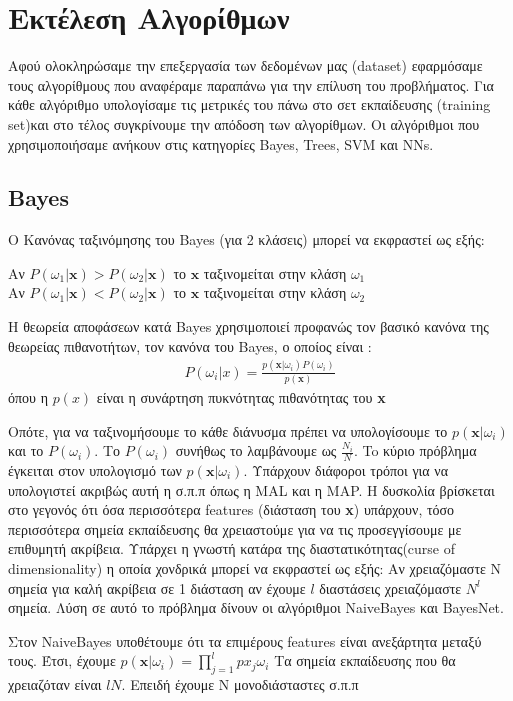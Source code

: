 \chapter{Εκτέλεση Αλγορίθμων}
Αφού ολοκληρώσαμε την επεξεργασία των δεδομένων μας (dataset) εφαρμόσαμε τους αλγορίθμους που αναφέραμε παραπάνω για την επίλυση του προβλήματος. Για κάθε αλγόριθμο υπολογίσαμε τις μετρικές του πάνω στο σετ εκπαίδευσης (training set)και στο τέλος συγκρίνουμε την απόδοση των αλγορίθμων. Οι αλγόριθμοι που χρησιμοποιήσαμε ανήκουν στις κατηγορίες Bayes, Trees, SVM και NNs.

\section{Bayes}
O Κανόνας ταξινόμησης του Βayes (για 2 κλάσεις) μπορεί να εκφραστεί ως εξής:
\begin{center}
Αν $P(\omega_1|\mathbf{x}) > P(\omega_2|\mathbf{x})$ το $\mathbf{x} $ ταξινομείται στην κλάση 
$\omega_1$\\
Αν $P(\omega_1|\mathbf{x}) < P(\omega_2|\mathbf{x})$ το $\mathbf{x} $ ταξινομείται στην κλάση 
$\omega_2$
\end{center}

Η θεωρεία αποφάσεων κατά Bayes χρησιμοποιεί προφανώς τον βασικό κανόνα της θεωρείας πιθανοτήτων, 
τον κανόνα του Bayes, ο οποίος είναι : 
\begin{align*}
P(\omega_i|x) = \frac{p(\mathbf{x}|\omega_i)P(\omega_i)}{p(\mathbf{x})}
\end{align*}
όπου η $p(x)$ είναι η συνάρτηση πυκνότητας πιθανότητας του  \textbf{x} 

Οπότε, για να ταξινομήσουμε το κάθε διάνυσμα πρέπει να υπολογίσουμε το $p(\mathbf{x}|\omega_i)$ και το
$P(\omega_i) $.
Το $ P(\omega_i)$ συνήθως το λαμβάνουμε ως $\frac{N_i}{N}$.
To κύριο πρόβλημα έγκειται
στον υπολογισμό των $p(\mathbf{x}|\omega_i)$.
Υπάρχουν διάφοροι τρόποι για να υπολογιστεί ακριβώς
αυτή  η σ.π.π όπως η MAL και η MAP.
Η δυσκολία βρίσκεται στο γεγονός ότι όσα περισσότερα features (διάσταση του  \textbf{x})
υπάρχουν, τόσο περισσότερα σημεία εκπαίδευσης θα χρειαστούμε για να τις 
προσεγγίσουμε με επιθυμητή ακρίβεια.
Υπάρχει η γνωστή κατάρα της διαστατικότητας(curse of dimensionality)
η οποία χονδρικά μπορεί να εκφραστεί ως εξής:
Αν χρειαζόμαστε Ν σημεία για καλή ακρίβεια σε 1 διάσταση αν έχουμε $l$ διαστάσεις χρειαζόμαστε $N^l$ σημεία.
Λύση σε αυτό το πρόβλημα δίνουν οι αλγόριθμοι NaiveBayes και BayesNet.
 
Στον NaiveBayes υποθέτουμε ότι τα επιμέρους features είναι ανεξάρτητα μεταξύ τους.
Έτσι, έχουμε 
$p(\mathbf{x}|\omega_i) = \prod_{j=1}^lp{x_j}{\omega_i}$
Τα σημεία εκπαίδευσης που θα χρειαζόταν είναι $lN$.
Επειδή έχουμε Ν μονοδιάσταστες σ.π.π  
 

